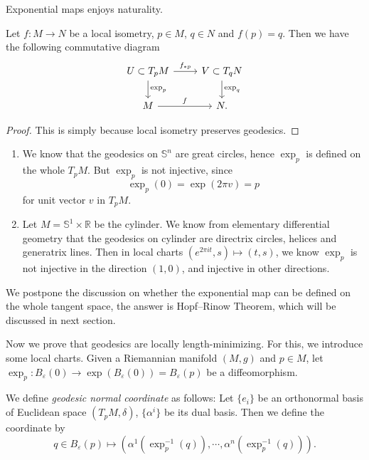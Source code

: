 Exponential maps enjoys naturality.
\begin{prop}\label{exp natural}
    Let $f:M\to N$ be a local isometry, $p\in M$, $q\in N$ and $f(p)=q$.
    Then we have the following commutative diagram
    \[\begin{tikzcd}
        U\subset T_pM \ar[r, "{f_{*p}}"] \ar[d, "{\exp_p}"] & V\subset T_qN \ar[d, "{\exp_q}"] \\
        M \ar[r, "f"] & N.
    \end{tikzcd}\]
\end{prop}
\begin{proof}
    This is simply because local isometry preserves geodesics.
\end{proof}

\begin{eg}
    \begin{enumerate}[(1)]
        \item We know that the geodesics on $\mathbb{S}^n$ are great circles, hence $\exp_p$ is defined on the whole $T_pM$.
        But $\exp_p$ is not injective, since 
        \[\exp_p(0)=\exp(2\pi v)=p\]
        for unit vector $v$ in $T_pM$.
        \item Let $M=\mathbb{S}^1\times\mathbb{R}$ be the cylinder.
        We know from elementary differential geometry that the geodesics on cylinder are directrix circles, helices and generatrix lines.
        Then in local charts $(e^{2\pi it},s)\mapsto(t,s)$, we know $\exp_p$ is not injective in the direction $(1,0)$, and injective in other directions.
    \end{enumerate}
\end{eg}

We postpone the discussion on whether the exponential map can be defined on the whole tangent space, the answer is Hopf--Rinow Theorem, which will be discussed in next section.

Now we prove that geodesics are locally length-minimizing.
For this, we introduce some local charts.
Given a Riemannian manifold $(M,g)$ and $p\in M$, let $\exp_p:B_\varepsilon(0)\to\exp(B_\varepsilon(0))=B_\varepsilon(p)$ be a diffeomorphism.

\begin{defn}
    We define \emph{geodesic normal coordinate} as follows:
    Let $\{e_i\}$ be an orthonormal basis of Euclidean space $(T_pM,\delta)$, $\{\alpha^i\}$ be its dual basis.
    Then we define the coordinate by
    \[q\in B_\varepsilon(p)\mapsto(\alpha^1(\exp_p^{-1}(q)),\cdots,\alpha^n(\exp_p^{-1}(q))).\]
\end{defn}

